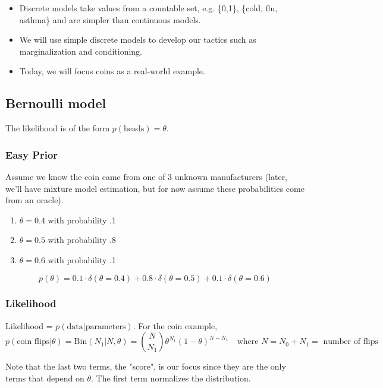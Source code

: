 \documentclass{article}
\begin{document}

\begin{itemize}
\item Discrete models take values from a countable set, e.g. \{0,1\}, \{cold, flu, asthma\} and are simpler than continuous models.
\item We will use simple discrete models to develop our tactics such as marginalization and conditioning. 
\item Today, we will focus coins as a real-world example.
\end{itemize}

\subsection{Bernoulli model}
The likelihood is of the form $p(\text{heads}) = \theta$.

\subsubsection*{Easy Prior}
Assume we know the coin came from one of 3 unknown manufacturers (later, we'll have mixture model estimation, but for now assume these probabilities come from an oracle).
\begin{enumerate}
\item $\theta = 0.4$ with probability .1
\item $\theta = 0.5$ with probability .8
\item $\theta = 0.6$ with probability .1
\end{enumerate}

$$p(\theta) = 0.1 \cdot \delta(\theta = 0.4)  + 0.8 \cdot \delta(\theta = 0.5) + 0.1 \cdot \delta(\theta = 0.6)$$

\subsubsection*{Likelihood}
Likelihood = $p(\text{data}|\text{parameters})$. For the coin example, 
$$p(\text{coin flips}|\theta) = \textrm{Bin}(N_1 | N, \theta) = {\binom{N}{N_1}} \theta^{N_1} (1-\theta)^{N-N_1} \quad \text{where $N = N_0 + N_1 =$ number of flips}$$

\noindent Note that the last two terms, the "score", is our focus since they are the only terms that depend on $\theta$. The first term normalizes the distribution.
\end{document}
